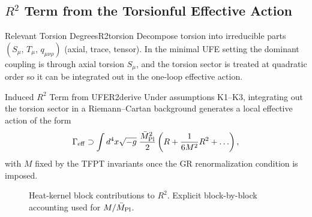 \subsection{\texorpdfstring{$R^2$ Term from the Torsionful Effective Action}{R2 Term from the Torsionful Effective Action}}
\label{sec:r2derive}

\begin{definition}{Relevant Torsion Degrees}{R2torsion}
Decompose torsion into irreducible parts $(S_\mu,\,T_\mu,\,q_{\mu\nu\rho})$ (axial, trace, tensor).
In the minimal UFE setting the dominant coupling is through axial torsion $S_\mu$, and the
torsion sector is treated at quadratic order so it can be integrated out in the one-loop
effective action.
\end{definition}

\begin{theorem}{Induced $R^2$ Term from UFE}{R2derive}
Under assumptions K1--K3, integrating out the torsion sector in a Riemann--Cartan background
generates a local effective action of the form
\begin{equation}
    \Gamma_{\mathrm{eff}} \supset \int d^4x\sqrt{-g}\;\frac{\bar{M}_{\mathrm{Pl}}^2}{2}
    \left(R + \frac{1}{6M^2}R^2 + \ldots\right),
\end{equation}
with $M$ fixed by the TFPT invariants once the GR renormalization condition is imposed.
\end{theorem}

\begin{figure}[H]
\centering
{}
\caption{Heat-kernel block contributions to $R^2$. Explicit block-by-block accounting used for $M/\bar M_{\rm Pl}$.}
\label{fig:r2-blocks}
\end{figure}

